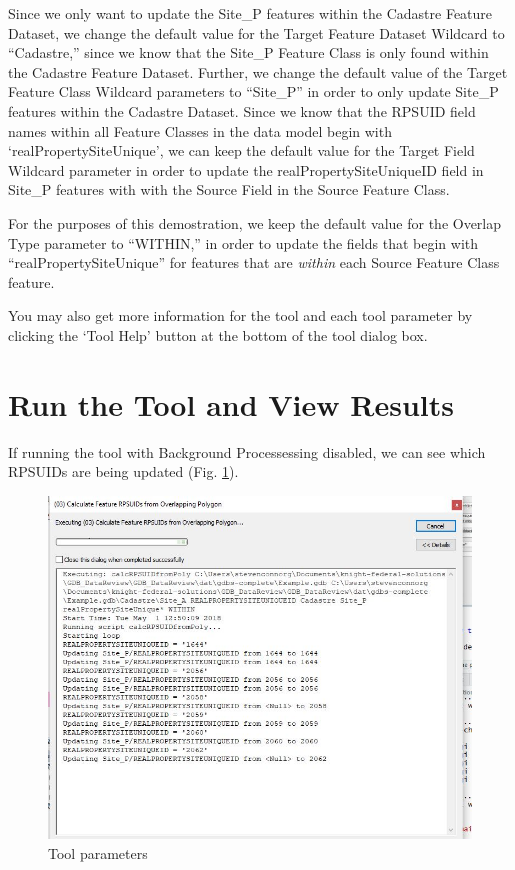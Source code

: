 \documentclass[openany]{book}
\theoremstyle{definition}
\theoremstyle{definition}
\theoremstyle{definition}
\theoremstyle{remark}
\begin{document}
Since we only want to update the Site\_P features within the Cadastre
Feature Dataset, we change the default value for the Target Feature
Dataset Wildcard to ``Cadastre,'' since we know that the Site\_P Feature
Class is only found within the Cadastre Feature Dataset. Further, we
change the default value of the Target Feature Class Wildcard parameters
to ``Site\_P'' in order to only update Site\_P features within the
Cadastre Dataset. Since we know that the RPSUID field names within all
Feature Classes in the data model begin with `realPropertySiteUnique',
we can keep the default value for the Target Field Wildcard parameter in
order to update the realPropertySiteUniqueID field in Site\_P features
with with the Source Field in the Source Feature Class.

For the purposes of this demostration, we keep the default value for the
Overlap Type parameter to ``WITHIN,'' in order to update the fields that
begin with ``realPropertySiteUnique'' for features that are
\emph{within} each Source Feature Class feature.

You may also get more information for the tool and each tool parameter
by clicking the `Tool Help' button at the bottom of the tool dialog box.

\section{Run the Tool and View
Results}\label{run-the-tool-and-view-results-1}

If running the tool with Background Processessing disabled, we can see
which RPSUIDs are being updated (Fig. \ref{fig:sjcmessages}).

\begin{figure}[H]

{\centering \includegraphics{figures/spatjoinCalc-toolmessages} 

}

\caption{Tool parameters}\label{fig:sjcmessages}
\end{figure}
\end{document}
